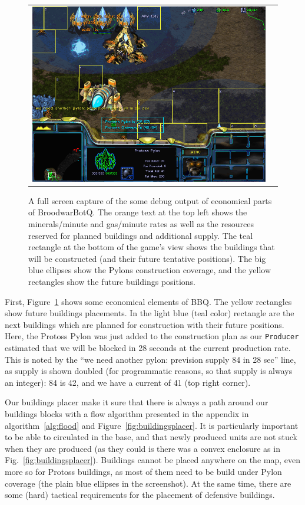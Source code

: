 \begin{figure}[h]
\begin{center}
\begin{tabular}{cc}
\includegraphics[width=0.90\columnwidth]{images/botgame/macro0.png}
\end{tabular}
\caption{A full screen capture of the some debug output of economical parts of BroodwarBotQ. The orange text at the top left shows the minerals/minute and gas/minute rates as well as the resources reserved for planned buildings and additional supply. The teal rectangle at the bottom of the game's view shows the buildings that will be constructed (and their future tentative positions). The big blue ellipses show the Pylons construction coverage, and the yellow rectangles show the future buildings positions.}
\label{fig:bot_macro}
\end{center}
\end{figure}

First, Figure~\ref{fig:bot_macro} shows some economical elements of BBQ. The yellow rectangles show future buildings placements. In the light blue (teal color) rectangle are the next buildings which are planned for construction with their future positions. Here, the Protoss Pylon was just added to the construction plan as our \texttt{Producer} estimated that we will be  blocked in 28 seconds at the current production rate. This is noted by the ``we need another pylon: prevision supply 84 in 28 sec'' line, as supply is shown doubled (for programmatic reasons, so that supply is always an integer): 84 is 42, and we have a current  of 41 (top right corner). 

Our buildings placer make it sure that there is always a path around our buildings blocks with a flow algorithm presented in the appendix in algorithm~\ref{alg:flood} and Figure~\ref{fig:buildingsplacer}. It is particularly important to be able to circulated in the base, and that newly produced units are not stuck when they are produced (as they could is there was a convex enclosure as in Fig.~\ref{fig:buildingsplacer}). Buildings cannot be placed anywhere on the map, even more so for Protoss buildings, as most of them need to be build under Pylon coverage (the plain blue ellipses in the screenshot). At the same time, there are some (hard) tactical requirements for the placement of defensive buildings.

